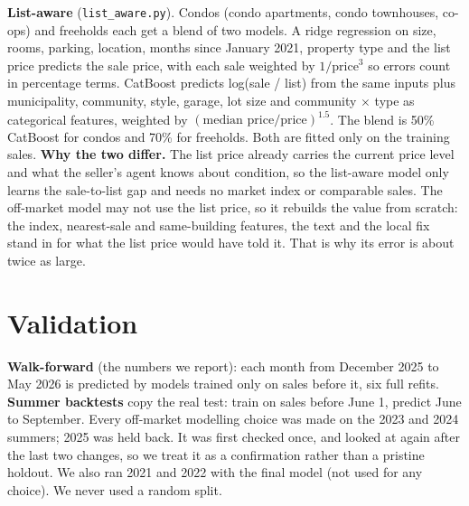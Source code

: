 \documentclass[11pt]{article}
\begin{document}
\textbf{List-aware} (\texttt{list\_aware.py}). Condos (condo apartments, condo townhouses, co-ops) and
freeholds each get a blend of two models. A ridge regression on size, rooms, parking, location, months since
January 2021, property type and the list price predicts the sale price, with each sale weighted by
$1/\textrm{price}^3$ so errors count in percentage terms. CatBoost predicts log(sale / list) from the same
inputs plus municipality, community, style, garage, lot size and community $\times$ type as categorical
features, weighted by $(\textrm{median price} / \textrm{price})^{1.5}$. The blend is 50\% CatBoost for condos
and 70\% for freeholds. Both are fitted only on the training sales.
\textbf{Why the two differ.} The list price already carries the current price level and what the seller's
agent knows about condition, so the list-aware model only learns the sale-to-list gap and needs no market
index or comparable sales. The off-market model may not use the list price, so it rebuilds the value from
scratch: the index, nearest-sale and same-building features, the text and the local fix stand in for what
the list price would have told it. That is why its error is about twice as large.

\section{Validation}
\textbf{Walk-forward} (the numbers we report): each month from December 2025 to May 2026 is predicted by
models trained only on sales before it, six full refits. \textbf{Summer backtests} copy the real test: train
on sales before June 1, predict June to September. Every off-market modelling choice was made on the 2023
and 2024 summers; 2025 was held back. It was first checked once, and looked at again after the last two
changes, so we treat it as a confirmation rather than a pristine holdout. We also ran 2021 and 2022 with the final model
(not used for any choice). We never used a random split.
\end{document}
